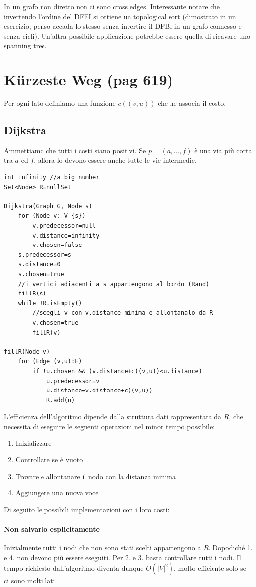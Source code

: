 \documentclass[a4paper]{book}
\newcommand{\lstIndent}{4}
\begin{document}
In un grafo non diretto non ci sono cross edges. Interessante notare che invertendo l'ordine del DFEI si ottiene un topological sort (dimostrato in un esercizio, penso accada lo stesso senza invertire il DFBI in un grafo connesso e senza cicli). Un'altra possibile applicazione potrebbe essere quella di ricavare uno spanning tree. 
\section{Kürzeste Weg (pag 619)}
Per ogni lato definiamo una funzione $c((v,u))$ che ne associa il costo.
\subsection{Dijkstra}
Ammettiamo che tutti i costi siano positivi. Se $p=(a,...,f)$ è una via più corta tra $a$ ed $f$, allora lo devono essere anche tutte le vie intermedie.
\begin{lstlisting}[tabsize=\lstIndent]
int infinity //a big number
Set<Node> R=nullSet
	
Dijkstra(Graph G, Node s)
	for (Node v: V-{s})
		v.predecessor=null
		v.distance=infinity
		v.chosen=false	
	s.predecessor=s
	s.distance=0
	s.chosen=true
	//i vertici adiacenti a s appartengono al bordo (Rand)
	fillR(s)
	while !R.isEmpty()
		//scegli v con v.distance minima e allontanalo da R
		v.chosen=true
		fillR(v)
		
fillR(Node v)
	for (Edge (v,u):E)
		if !u.chosen && (v.distance+c((v,u))<u.distance)
			u.predecessor=v
			u.distance=v.distance+c((v,u))
			R.add(u)				
\end{lstlisting}
L'efficienza dell'algoritmo dipende dalla struttura dati rappresentata da $R$, che necessita di eseguire le seguenti operazioni nel minor tempo possibile:
\begin{enumerate}
\item Inizializzare
\item Controllare se è vuoto
\item Trovare e allontanare il nodo con la distanza minima
\item Aggiungere una nuova voce
\end{enumerate}
Di seguito le possibili implementazioni con i loro costi:
\paragraph*{Non salvarlo esplicitamente}
Inizialmente tutti i nodi che non sono stati scelti appartengono a $R$. Dopodiché 1. e 4. non devono più essere eseguiti. Per 2. e 3. basta controllare tutti i nodi. Il tempo richiesto dall'algoritmo diventa dunque $O(|V|^2)$, molto efficiente solo se ci sono molti lati.
\end{document}
